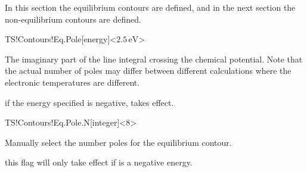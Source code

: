 In this section the equilibrium contours are defined, and in the next
section the non-equilibrium contours are defined.

\begin{fdfentry}{TS!Contours!Eq.Pole}[energy]<$2.5\,\mathrm{eV}$>

  The imaginary part of the line integral crossing the chemical
  potential. Note that the actual number of poles may differ between
  different calculations where the electronic temperatures are
  different.

  \note if the energy specified is negative,
   takes effect.
  
\end{fdfentry}

\begin{fdfentry}{TS!Contours!Eq.Pole.N}[integer]<8>

  Manually select the number poles for the equilibrium contour. 

  \note this flag will only take effect if 
  is a negative energy.
  
\end{fdfentry}

